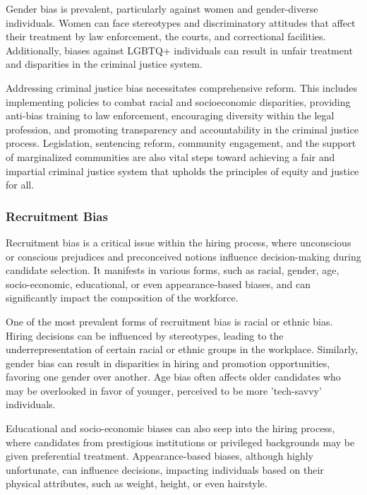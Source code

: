 \documentclass[12pt,a4paper,openright,twoside]{book}
\begin{document}
Gender bias is prevalent, particularly against women and gender-diverse individuals. Women can face stereotypes and discriminatory attitudes that affect their treatment by law enforcement, the courts, and correctional facilities. Additionally, biases against LGBTQ+ individuals can result in unfair treatment and disparities in the criminal justice system. \cite{gebru2020race} 

Addressing criminal justice bias necessitates comprehensive reform. This includes implementing policies to combat racial and socioeconomic disparities, providing anti-bias training to law enforcement, encouraging diversity within the legal profession, and promoting transparency and accountability in the criminal justice process. Legislation, sentencing reform, community engagement, and the support of marginalized communities are also vital steps toward achieving a fair and impartial criminal justice system that upholds the principles of equity and justice for all.


\subsubsection{Recruitment Bias}

Recruitment bias is a critical issue within the hiring process, where unconscious or conscious prejudices and preconceived notions influence decision-making during candidate selection. It manifests in various forms, such as racial, gender, age, socio-economic, educational, or even appearance-based biases, and can significantly impact the composition of the workforce. \cite{mujtaba2019ethical} 

One of the most prevalent forms of recruitment bias is racial or ethnic bias. Hiring decisions can be influenced by stereotypes, leading to the underrepresentation of certain racial or ethnic groups in the workplace. Similarly, gender bias can result in disparities in hiring and promotion opportunities, favoring one gender over another. Age bias often affects older candidates who may be overlooked in favor of younger, perceived to be more 'tech-savvy' individuals. 

Educational and socio-economic biases can also seep into the hiring process, where candidates from prestigious institutions or privileged backgrounds may be given preferential treatment. Appearance-based biases, although highly unfortunate, can influence decisions, impacting individuals based on their physical attributes, such as weight, height, or even hairstyle. 
\end{document}

